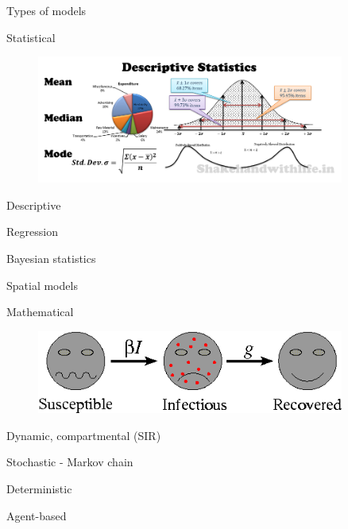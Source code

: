 \documentclass[table]{beamer}\usepackage[]{graphicx}\usepackage[]{color}
\begin{document}
\begin{frame}[fragile]{Types of models}

\begin{block}{Statistical}
\begin{minipage}{.49\textwidth}
\begin{figure}
  \flushleft
  \includegraphics[width=0.9\textwidth,keepaspectratio]{statistics2.png}
\end{figure}
\end{minipage}
\begin{minipage}{.49\textwidth}
Descriptive \par
\vspace{0.1cm}
Regression \par
\vspace{0.1cm}
Bayesian statistics \par
\vspace{0.1cm}
Spatial models
\end{minipage} \hfill
\end{block}
\begin{block}{Mathematical}
\begin{minipage}{.49\textwidth}
\begin{figure}
  \flushleft
  \includegraphics[width=0.9\textwidth,keepaspectratio]{sir2.png}
\end{figure}
\end{minipage} \hfill %
\begin{minipage}{.49\textwidth}
Dynamic, compartmental (SIR) \par %
\vspace{0.1cm}
Stochastic - Markov chain \par
\vspace{0.1cm}
Deterministic \par
\vspace{0.1cm}
Agent-based
\end{minipage}
\end{block}


\end{frame}
\end{document}
